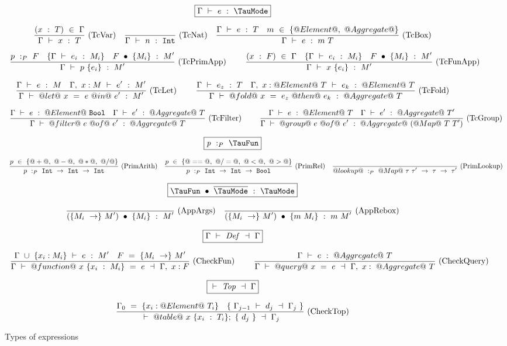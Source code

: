 
\begin{figure*}


$$
\boxed{\Typecheck{\Gamma}{e}{\TauMode}}
$$


$$
\enskip \frac {\displaystyle 
    (x~:~T)~\in~\Gamma
} {\displaystyle  
    \Gamma ~\vdash~ x~:~T
} \  \mbox{(TcVar)} \enskip
\enskip \frac {\displaystyle 
} {\displaystyle  
    \Gamma ~\vdash~ n~:~\mathtt{Int}
} \  \mbox{(TcNat)} \enskip
\enskip \frac {\displaystyle 
  \Gamma ~\vdash~ e~:~T
  \quad
  m~\in~\{@Element@,~@Aggregate@\}
} {\displaystyle  
    \Gamma ~\vdash~ e~:~m~T
} \  \mbox{(TcBox)} \enskip
$$

$$
\enskip \frac {\displaystyle 
    p~:_P~F
    \quad
    \{ \Gamma ~\vdash~ e_i~:~M_i \}
    \quad
    F~\bullet~\{M_i\}~:~M'
} {\displaystyle  
    \Gamma ~\vdash~ p~\{e_i\}~:~M'
} \  \mbox{(TcPrimApp)} \enskip~~~~
\enskip \frac {\displaystyle 
    (x~:~F)~\in~\Gamma
    \quad
    \{ \Gamma ~\vdash~ e_i~:~M_i \}
    \quad
    F~\bullet~\{M_i\}~:~M'
} {\displaystyle  
    \Gamma ~\vdash~ x~\{e_i\}~:~M'
} \  \mbox{(TcFunApp)} \enskip
$$

$$
\enskip \frac {\displaystyle 
  \Gamma ~\vdash~ e~:~M
  \quad
  \Gamma,~x:M ~\vdash~ e'~:~M'
} {\displaystyle 
  \Gamma ~\vdash~ @let@~x~=~e~@in@~e'~:~M'
} \  \mbox{(TcLet)} \enskip~~~~
\enskip \frac {\displaystyle 
  \Gamma ~\vdash~ e_z~:~T
  \quad
  \Gamma,~x:@Element@~T ~\vdash~ e_k~:~@Element@~T
} {\displaystyle 
  \Gamma ~\vdash~ @fold@~x~=~e_z~@then@~e_k~:~@Aggregate@~T
} \  \mbox{(TcFold)} \enskip
$$

$$
\enskip \frac {\displaystyle 
  \Gamma ~\vdash~ e~:~@Element@~\mathtt{Bool}
  \quad
  \Gamma ~\vdash~ e'~:~@Aggregate@~T
} {\displaystyle 
  \Gamma ~\vdash~ @filter@~e~@of@~e'~:~@Aggregate@~T
} \  \mbox{(TcFilter)} \enskip~~~~
\enskip \frac {\displaystyle 
  \Gamma ~\vdash~ e~:~@Element@~T
  \quad
  \Gamma ~\vdash~ e'~:~@Aggregate@~T'
} {\displaystyle 
  \Gamma ~\vdash~ @group@~e~@of@~e'~:~@Aggregate@~(@Map@~T~T')
} \  \mbox{(TcGroup)} \enskip
$$


$$
\boxed{\TypecheckP{\mi{p}}{\TauFun}}
$$

$$
\enskip \frac {\displaystyle 
  p~\in~\{@+@,~@-@,~@*@,~@/@\}
} {\displaystyle 
  p~:_P~\mathtt{Int}~\to~\mathtt{Int}~\to~\mathtt{Int}
} \  \mbox{(PrimArith)} \enskip
\enskip \frac {\displaystyle 
  p~\in~\{@==@,~@/=@,~@<@,~@>@\}
} {\displaystyle 
  p~:_P~\mathtt{Int}~\to~\mathtt{Int}~\to~\mathtt{Bool}
} \  \mbox{(PrimRel)} \enskip
\enskip \frac {\displaystyle } {\displaystyle 
  @lookup@~:_P~@Map@~\tau~\tau'~\to~\tau~\to~\tau'
} \  \mbox{(PrimLookup)} \enskip
$$

$$
\boxed{\TypecheckApp{\TauFun}{\ov{\TauMode}}{\TauMode}}
$$

$$
\enskip \frac {\displaystyle 
} {\displaystyle 
  (\{M_i~\to\}~M')~\bullet~\{M_i\}~:~M'
} \  \mbox{(AppArgs)} \enskip
\enskip \frac {\displaystyle 
} {\displaystyle 
  (\{M_i~\to\}~M')~\bullet~\{m~M_i\}~:~m~M'
} \  \mbox{(AppRebox)} \enskip
$$

$$
\boxed{\TypecheckS{\Gamma}{\mi{Def}}{\Gamma}}
$$

$$
\ruleIN
{
  \Typecheck{\Gamma~\cup~\{x_i:M_i\}}{e}{M'}
  \quad
  F~=~\{M_i~\to\}~M'
}
{
  \TypecheckS{\Gamma}{@function@~x~\{x_i~:~M_i\}~=~e}{\Gamma,~x:F}
}{CheckFun}~~~~
\ruleIN
{
  \Typecheck{\Gamma}{e}{@Aggregate@~T}
}
{
  \TypecheckS{\Gamma}{@query@~x~=~e}{\Gamma,~x:~@Aggregate@~T}
}{CheckQuery}
$$

$$
\boxed{\TypecheckS{}{\mi{Top}}{\Gamma}}
$$

$$
\ruleIN
{
  \Gamma_0~=~\{x_i:@Element@~T_i\}
  \quad
  \{~\TypecheckS{\Gamma_{j-1}}{d_j}{\Gamma_j}~\}
}
{
  \TypecheckS
    {}
    {
      @table@
      ~x~\{x_i~:~T_i\};
      ~\{~d_j~\}
    }
    {\Gamma_j}
}{CheckTop}
$$


\caption{Types of expressions}
\label{fig:source:type:exp}
\end{figure*}

